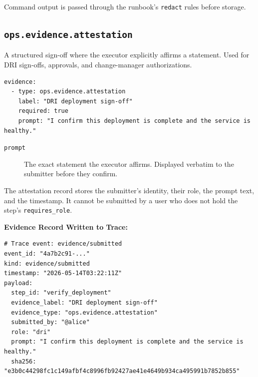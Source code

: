 Command output is passed through the runbook's \texttt{redact} rules before storage.

\subsection{\texttt{ops.evidence.attestation}}

A structured sign-off where the executor explicitly affirms a statement. Used for DRI
sign-offs, approvals, and change-manager authorizations.

\begin{verbatim}
evidence:
  - type: ops.evidence.attestation
    label: "DRI deployment sign-off"
    required: true
    prompt: "I confirm this deployment is complete and the service is healthy."
\end{verbatim}

\begin{description}
  \item[\texttt{prompt}] The exact statement the executor affirms. Displayed verbatim to
    the submitter before they confirm.
\end{description}

The attestation record stores the submitter's identity, their role, the prompt text, and the
timestamp. It cannot be submitted by a user who does not hold the step's \texttt{requires\_role}.
\newline

\noindent\textbf{Evidence Record Written to Trace:}
\begin{verbatim}
# Trace event: evidence/submitted
event_id: "4a7b2c91-..."
kind: evidence/submitted
timestamp: "2026-05-14T03:22:11Z"
payload:
  step_id: "verify_deployment"
  evidence_label: "DRI deployment sign-off"
  evidence_type: "ops.evidence.attestation"
  submitted_by: "@alice"
  role: "dri"
  prompt: "I confirm this deployment is complete and the service is healthy."
  sha256: "e3b0c44298fc1c149afbf4c8996fb92427ae41e4649b934ca495991b7852b855"
\end{verbatim}
